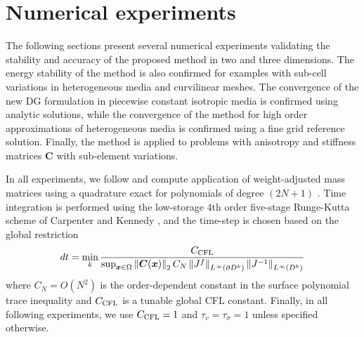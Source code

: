 \documentclass{siamart0216}
\newcommand{\pd}[2]{\frac{\partial#1}{\partial#2}}
\newcommand{\nor}[1]{\left\| #1 \right\|}
\newcommand{\LRp}[1]{\left( #1 \right)}
\renewcommand{\L}{L^2\LRp{\Omega}}
\begin{document}


\section{Numerical experiments}
\label{sec:numerical}
The following sections present several numerical experiments validating the stability and accuracy of the proposed method in two and three dimensions.  The energy stability of the method is also confirmed for examples with sub-cell variations in heterogeneous media and curvilinear meshes.  The convergence of the new DG formulation in piecewise constant isotropic media is confirmed using analytic solutions, while the convergence of the method for high order approximations of heterogeneous media is confirmed using a fine grid reference solution.  Finally, the method is applied to problems with anisotropy and stiffness matrices $\bm{C}$ with sub-element variations.  

In all experiments, we follow \cite{chan2016weight1} and compute application of weight-adjusted mass matrices using a quadrature exact for polynomials of degree $(2N+1)$ \cite{xiao2010quadrature}.  Time integration is performed using the low-storage 4th order five-stage Runge-Kutta scheme of Carpenter and Kennedy \cite{carpenter1994fourth}, and the time-step is chosen based on the global restriction
\[
dt = \min_{k} \frac{C_{\rm CFL}}{  \sup_{\bm{x}\in\Omega}\nor{\bm{C}(\bm{x})}_{2} C_N \nor{J^f}_{L^{\infty}\LRp{\partial D^k}}\nor{J^{-1}}_{L^{\infty}\LRp{D^k}}}
\]
where $C_N = O(N^2)$ is the order-dependent constant in the surface polynomial trace inequality \cite{chan2015gpu} and $C_{\rm CFL}$ is a tunable global CFL constant.  Finally, in all following experiments, we use $C_{\rm CFL} = 1$ and $\tau_v = \tau_\sigma = 1$ unless specified otherwise.  
\end{document}
